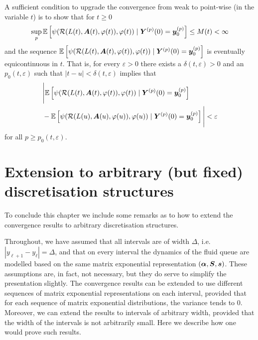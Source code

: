 A sufficient condition to upgrade the convergence from weak to point-wise (in the variable \(t\)) is to show that for \(t\geq 0\) 
\[\sup_{p}\mathbb E\left[\psi( \mathcal R(L(t),\boldsymbol A(t),\varphi(t)),\varphi(t) )  \mid \boldsymbol Y^{(p)}(0)=\boldsymbol y_0^{(p)} \right]  \leq M(t)<\infty\]
and the sequence \(\mathbb E\left[\psi( \mathcal R(L(t),\boldsymbol A(t),\varphi(t)),\varphi(t) )   \mid \boldsymbol Y^{(p)}(0)=\boldsymbol y_0^{(p)} \right]  \) is eventually equicontinuous in \(t\). That is, for every \(\varepsilon>0\) there exists a \(\delta(t,\varepsilon)>0\) and an \(p_0(t,\varepsilon)\) such that \(|t-u|<\delta(t,\varepsilon)\) implies that 
\begin{align}
	&\nonumber \Bigg|\mathbb E\left[\psi( \mathcal R(L(t),\boldsymbol A(t),\varphi(t)),\varphi(t) )   \mid \boldsymbol Y^{(p)}(0)=\boldsymbol y_0^{(p)} \right] 
	\\&{}-\mathbb E\left[\psi( \mathcal R(L(u),\boldsymbol A(u),\varphi(u)),\varphi(u) )   \mid \boldsymbol Y^{(p)}(0)=\boldsymbol y_0^{(p)}\right] \Bigg| \nonumber 
	<\varepsilon
\end{align}
for all \(p\geq p_0(t,\varepsilon)\). 


\section{Extension to arbitrary (but fixed) discretisation structures}
To conclude this chapter we include some remarks as to how to extend the convergence results to arbitrary discretisation structures. 

Throughout, we have assumed that all intervals are of width \(\Delta\), i.e.~\(|y_{\ell+1}-y_\ell|=\Delta\), and that on every interval the dynamics of the fluid queue are modelled based on the same matrix exponential representation \((\boldsymbol \alpha, \boldsymbol S, \boldsymbol s)\). These assumptions are, in fact, not necessary, but they do serve to simplify the presentation slightly. The convergence results can be extended to use different sequences of matrix exponential representations on each interval, provided that for each sequence of matrix exponential distributions, the variance tends to \(0\). Moreover, we can extend the results to intervals of arbitrary width, provided that the width of the intervals is not arbitrarily small. Here we describe how one would prove such results.

